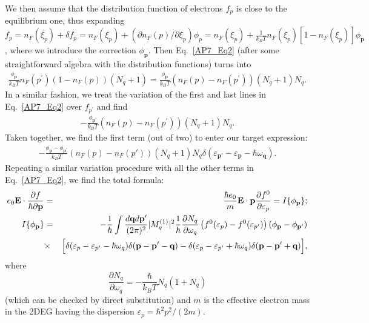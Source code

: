 We then assume that the distribution function of electrons $f_p$ is close to the equilibrium one, thus expanding $f_p=n_F(\xi_p)+\delta f_p=n_F(\xi_p)+(\partial n_F(p)/\partial \xi_p)\phi_p=n_F(\xi_p)+\frac{1}{k_BT}n_F(\xi_p)[1-n_F(\xi_p)]\phi_\mathbf{p}$, where we introduce the correction $\phi_\mathbf{p}$. Then Eq.~\eqref{AP7_Eq2} (after some straightforward algebra with the distribution functions) turns into
%
\begin{eqnarray}
\label{AP7_EqPhi}
\frac{\phi_\mathbf{p}}{k_BT}n_F(p^\prime)(1-n_F(p))
(N_q+1)
=\frac{\phi_\mathbf{p}}{k_BT}
(n_F(p)-n_F(p^\prime))
(N_q+1)N_q.
\end{eqnarray}
%
In a similar fashion, we treat the variation of the first and last lines in Eq.~\eqref{AP7_Eq2} over $f_{p^\prime}$ and find
%
\begin{eqnarray}
\label{AP7_EqPhiPrime1}
-\frac{\phi_{\mathbf{p}^\prime}}{k_BT}
(n_F(p)-n_F(p^\prime))
(N_q+1)N_q.
\end{eqnarray}
%
Taken together, we find the first term (out of two) to enter our target expression:
%
\begin{eqnarray}
-\frac{\phi_\mathbf{p}-\phi_{\mathbf{p}^\prime}}{k_BT}
(n_F(p)-n_F(p'))
(N_q+1)N_q
\delta(\varepsilon_{\textbf{p}'}-\varepsilon_{\textbf{p}}-\hbar\omega_{\textbf{q}}).
\end{eqnarray}
%
Repeating a similar variation procedure with all the other terms in Eq.~\eqref{AP7_Eq2}, we find the total formula:
%
\begin{eqnarray}
\label{AP7_3}
e_0\textbf{E}\cdot\frac{\partial f}{\hbar\partial \textbf{p}}&=&\frac{\hbar e_0}{m}\textbf{E}\cdot\textbf{p}\frac{\partial f^0}{\partial \varepsilon_p}=I\{\phi_\textbf{p}\};\\
I\{\phi_\textbf{p}\}&=&-\frac{1}{\hbar}\int\frac{d\textbf{q}d\textbf{p}'}{(2\pi)^2}|M^{(1)}_q|^2\frac{1}{\hbar}\frac{\partial N_q}{\partial \omega_q}
\left(f^0(\varepsilon_p)-f^0(\varepsilon_{p'})\right)
\left(\phi_{\textbf{p}}-\phi_{\textbf{p}'}\right) \\ \nonumber
&\times&\Bigl[\delta(\varepsilon_{p}-\varepsilon_{p'}-\hbar\omega_q)\delta(\textbf{p}-\textbf{p}'-\textbf{q})
-\delta(\varepsilon_{p}-\varepsilon_{p'}+\hbar\omega_q)\delta(\textbf{p}-\textbf{p}'+\textbf{q})\Bigr],
\end{eqnarray}
%
where
%
$$\frac{\partial N_q}{\partial \omega_q}=-\frac{\hbar}{k_BT}N_q(1+N_q)$$
%
(which can be checked by direct substitution) and $m$ is the effective electron mass in the 2DEG having the dispersion $\varepsilon_p=\hbar^2p^2/(2m)$.

